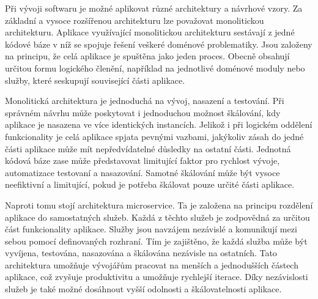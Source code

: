

Při vývoji softwaru je možné aplikovat různé architektury a návrhové vzory. Za základní a vysoce rozšířenou architekturu lze považovat monolitickou architekturu. Aplikace využívající monolitickou architekturu sestávají z jedné kódové báze v níž se spojuje řešení veškeré doménové problematiky. \cite{Williams2023} Jsou založeny na principu, že celá aplikace je spuštěna jako jeden proces. Obecně obsahují určitou formu logického členění, například na jednotlivé doménové moduly nebo služby, které seskupují související části aplikace. \cite{Williams2023} 


Monolitická architektura je jednoduchá na vývoj, nasazení a testování. Při správném návrhu může poskytovat i jednoduchou možnost škálování, kdy aplikace je nasazena ve více identických instancích. \cite{Richardson2018} Jelikož i při logickém oddělení funkcionality je celá aplikace spjata pevnými vazbami, jakýkoliv zásah do jedné části aplikace může mít nepředvídatelné důsledky na ostatní části. Jednotná kódová báze zase může představovat limitující faktor pro rychlost vývoje, automatizace testovaní a nasazování. Samotné škálování může být vysoce neefiktivní a limitující, pokud je potřeba škálovat pouze určité části aplikace. \cite{Richardson2018}

Naproti tomu stojí architektura microservice. Ta je založena na principu rozdělení aplikace do samostatných služeb. Každá z těchto služeb je zodpovědná za určitou část funkcionality aplikace. Služby jsou navzájem nezávislé a komunikují mezi sebou pomocí definovaných rozhraní. \cite{Richardson2018} Tím je zajištěno, že každá služba může být vyvíjena, testována, nasazována a škálována nezávisle na ostatních. Tato architektura umožňuje vývojářům pracovat na menších a jednodušších částech aplikace, což zvyšuje produktivitu a umožňuje rychlejší iterace. Díky nezávislosti služeb je také možné dosáhnout vyšší odolnosti a škálovatelnosti aplikace. 


